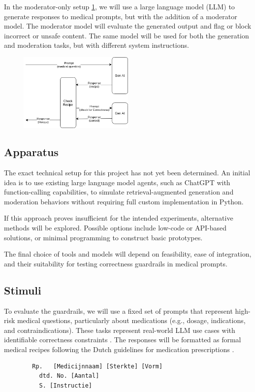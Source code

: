 In the moderator-only setup \ref{fig:moderatorSetup}, we will use a large language model (LLM) to generate responses to medical prompts, but with the addition of a moderator model.
The moderator model will evaluate the generated output and flag or block incorrect or unsafe content.
The same model will be used for both the generation and moderation tasks, but with different system instructions.

\begin{figure}
    \includegraphics[width=0.5\textwidth]{figures/moderatorSetup.png}
    \label{fig:moderatorSetup}
\end{figure}

\subsection{Apparatus}

The exact technical setup for this project has not yet been determined. An initial idea is to use existing large language model agents, such as ChatGPT with function-calling capabilities, to simulate retrieval-augmented generation and moderation behaviors without requiring full custom implementation in Python.

If this approach proves insufficient for the intended experiments, alternative methods will be explored. Possible options include low-code or API-based solutions, or minimal programming to construct basic prototypes.

The final choice of tools and models will depend on feasibility, ease of integration, and their suitability for testing correctness guardrails in medical prompts.

\subsection{Stimuli}

To evaluate the guardrails, we will use a fixed set of prompts that represent high-risk medical questions, particularly about medications (e.g., dosage, indications, and contraindications).
These tasks represent real-world LLM use cases with identifiable correctness constraints \citep{pais2024medication}.
The responses will be formatted as formal medical recipes following the Dutch guidelines for medication prescriptions \citep{farmacotherapeutischkompas}.
\begin{verbatim}
        Rp.   [Medicijnnaam] [Sterkte] [Vorm]
          dtd. No. [Aantal]
          S. [Instructie]
\end{verbatim}

